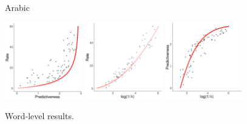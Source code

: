 \documentclass[11pt,letterpaper]{article}
\begin{document}
\begin{figure}
\begin{center}
		Arabic

		\includegraphics[width=0.3\textwidth]{code/figures/ar-words-info-fitted.pdf}
\includegraphics[width=0.3\textwidth]{code/figures/ar-words-nlogbeta-mem-fitted.pdf}
\includegraphics[width=0.3\textwidth]{code/figures/ar-words-nlogbeta-ee-fitted.pdf}
	\end{center}
	\caption{Word-level results.}\label{fig:ar-logbeta-fit}
\end{figure}
\end{document}

